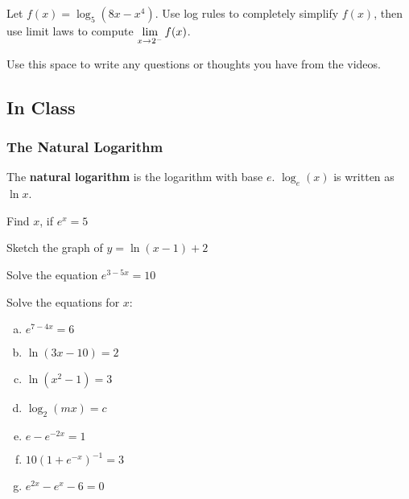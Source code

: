\documentclass[notes]{subfiles}
\begin{document}
		\begin{ex}
			Let $f(x) = \log_5(8x-x^4)$.  Use log rules to completely simplify $f(x)$, then use limit laws to compute $\displaystyle \lim_{x\to 2^-} f(x)$.
		\end{ex}
			
		\begin{question}
			Use this space to write any questions or thoughts you have from the videos.
		\end{question}
			\newpage
			
	\subsection*{In Class}
	\subsubsection*{The Natural Logarithm}
		\begin{defn}
			The \textbf{natural logarithm} is the logarithm with base $e$.  $\log_e(x)$ is written as $\ln x$.
		\end{defn}
		
		\begin{ex}
			Find $x$, if $e^x = 5$
		\end{ex}
			
		\begin{ex}
			Sketch the graph of $y = \ln(x-1) + 2$
		\end{ex}
			
		\begin{ex}
			Solve the equation $e^{3-5x} = 10$
		\end{ex}
			\newpage
		
		\begin{ex}
			Solve the equations for $x$:
			\begin{enumerate}[(a)]
				\item $e^{7-4x} = 6$
					
				\item $\ln(3x-10) = 2$
					
				\item $\ln(x^2-1) = 3$
					
				\item $\log_2(mx) = c$
					
				\item $e-e^{-2x} = 1$
					
				\item $10(1+e^{-x})^{-1} = 3$
					
				\item $e^{2x} - e^x - 6 = 0$
			\end{enumerate}
		\end{ex}	
			\newpage
		
\end{document}
